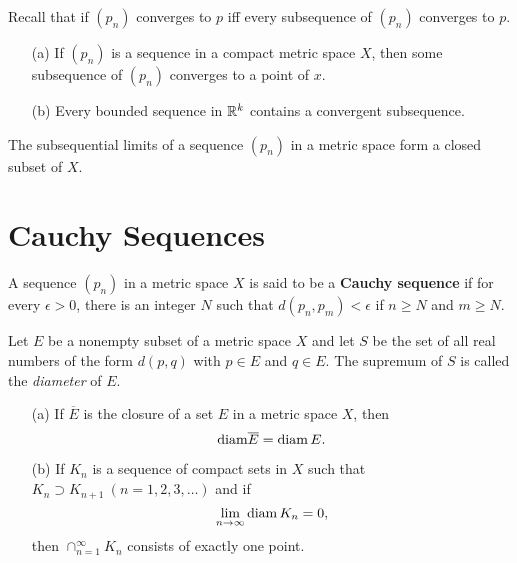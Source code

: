 \documentclass[11pt,a4paper]{book}
\begin{document}
Recall that if \( ({p}_{n}) \) converges to \( p  \) iff every subsequence of \( ({p}_{n}) \) converges to \( p  \).

\begin{theorem}[3.6]
    \begin{enumerate}
        \item[(a)] If \( ({p}_{n}) \) is a sequence in a compact metric space \( X  \), then some subsequence of \( ({p}_{n}) \) converges to a point of \( x  \).
        \item[(b)] Every bounded sequence in \( \mathbb{R}^{k} \) contains a convergent subsequence.
    \end{enumerate}
\end{theorem}

\begin{theorem}[3.7]
    The subsequential limits of a sequence \( ({p}_{n}) \) in a metric space form a closed subset of \( X  \).
\end{theorem}


\section{Cauchy Sequences}

\begin{definition}[3.8]
    A sequence \( ({p}_{n}) \) in a metric space \( X  \) is said to be a \textbf{Cauchy sequence} if for every \( \epsilon > 0  \), there is an integer \( N  \) such that \( d({p}_{n}, {p}_{m}) < \epsilon  \) if \( n \geq N  \) and \( m \geq N  \).
\end{definition}

\begin{definition}[3.9]
    Let \( E  \) be a nonempty subset of a metric space \( X  \) and let \( S  \) be the set of all real numbers of the form \( d(p,q) \) with \( p \in E  \) and \( q \in E  \). The supremum of \( S  \) is called the \textit{diameter} of \( E  \).
\end{definition}

\begin{theorem}[3.10]
   \begin{enumerate}
       \item[(a)] If \( \overline{E} \) is the closure of a set \( E  \) in a metric space \( X  \), then
           \[  \text{diam} \overline{E} = \operatorname{diam} E.  \]
        \item[(b)] If \( {K}_{n} \) is a sequence of compact sets in \( X  \) such that \( {K}_{n} \supset {K}_{n+1} \ (n = 1,2,3,\dots) \) and if  
            \[  \lim_{ n \to \infty  }  \diam {K}_{n} = 0, \]
            then \( \cap_{n=1}^{\infty }{K}_{n}  \) consists of exactly one point.
   \end{enumerate} 
\end{theorem}
\end{document}
